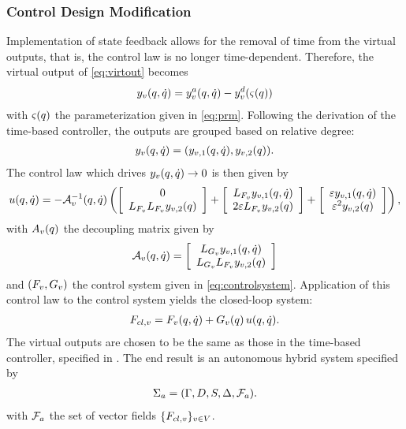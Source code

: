 \subsubsection{Control Design Modification}
Implementation of state feedback allows for the removal of time from the virtual
outputs, that is, the control law is no longer time-dependent.
%
Therefore, the virtual output of \eqref{eq:virtout} becomes
\begin{align*}
  y_{v}(q, \dot{q}) = y_{v}^a(q, \dot{q}) - y_{v}^{d}(\varsigma(q))
\end{align*}
with $\varsigma(q)$ the parameterization given in \eqref{eq:prm}.
%
Following the derivation of the time-based controller, the outputs are grouped
based on relative degree:
\begin{align*}
  y_{v}(q, \dot{q}) = (y_{v,1}(q, \dot{q}), y_{v,2}(q)).
\end{align*}
The control law which drives $y_{v}(q, \dot{q}) \to 0$ is then given by
\begin{align*}
  u(q, \dot{q}) = -\mathcal{A}_{v}^{-1}(q, \dot{q}) \left(
  \left[ \begin{array}{c}
      0\\
      L_{F_{v}} L_{F_{v}} y_{v,2}(q)
    \end{array} \right] +
  \left[ \begin{array}{c}
      L_{F_{v}} y_{v,1}(q, \dot{q})\\
      2 \varepsilon L_{F_{v}} y_{v,2}(q)
    \end{array} \right] +
  \left[ \begin{array}{c}
      \varepsilon y_{v,1}(q, \dot{q})\\
      \varepsilon^2 y_{v,2}(q)
    \end{array} \right]\right),
\end{align*}
with $A_{v}(q)$ the decoupling matrix given by
\begin{align}
  \mathcal{A}_{v}(q, \dot{q}) =
  \left[\begin{array}{c}
      L_{G_{v}} y_{v,1} (q, \dot{q})\\
      L_{G_{v}} L_{F_{v}} y_{{v},2}(q)
    \end{array}\right]
\end{align}
and $(F_{v}, G_{v})$ the control system given in
\eqref{eq:controlsystem}.
%
Application of this control law to the control system yields the closed-loop
system:
\begin{align}
  F_{cl,v} = F_{v}(q, \dot{q}) + G_{v}(q) \, u(q, \dot{q}).
\end{align}
The virtual outputs are chosen to be the same as those in the time-based
controller, specified in .
%
The end result is an autonomous hybrid system specified by
\begin{align}
  \Sigma_{a} = (\Gamma, D, S, \Delta, \mathcal{F}_{a}).
\end{align}
with $\mathcal{F}_{a}$ the set of vector fields $\{F_{cl,v}\}_{v \in V}$.


